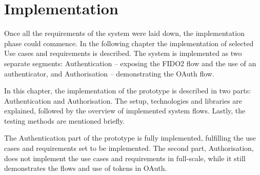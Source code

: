 \section{Implementation}\label{sec:implementation}

Once all the requirements of the system were laid down, the implementation phase could commence. In the following chapter the implementation of selected Use cases and requirements is described. The system is implemented as two separate segments: Authentication -- exposing the FIDO2 flow and the use of an authenticator, and Authorisation -- demonstrating the OAuth flow.  




In this chapter, the implementation of the prototype is described in two parts: Authentication and Authorisation. The setup, technologies and libraries are explained, followed by the overview of implemented system flows. Lastly, the testing methods are mentioned briefly. 

The Authentication part of the prototype is fully implemented, fulfilling the use cases and requirements set to be implemented. The second part, Authorisation, does not implement the use cases and requirements in full-scale, while it still demonstrates the flows and use of tokens in OAuth.